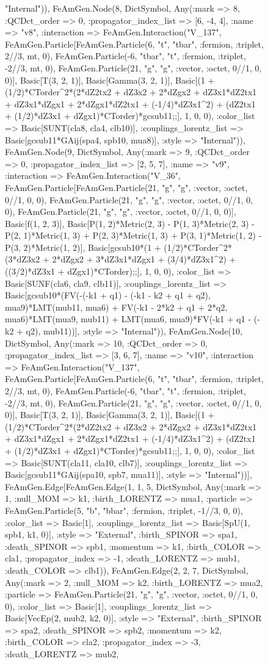 \documentclass{revtex4}
\begin{document}
\begin{figure}[!htb]
\begin{center}
{"Internal")), FeAmGen.Node(8, Dict{Symbol, Any}(:mark => 8, :QCDct_order => 0, :propagator_index_list => [6, -4, 4], :name => "v8", :interaction => FeAmGen.Interaction("V_137", FeAmGen.Particle[FeAmGen.Particle(6, "t", "tbar", :fermion, :triplet, 2//3, mt, 0), FeAmGen.Particle(-6, "tbar", "t", :fermion, :triplet, -2//3, mt, 0), FeAmGen.Particle(21, "g", "g", :vector, :octet, 0//1, 0, 0)], Basic[T(3, 2, 1)], Basic[Gamma(3, 2, 1)], Basic[(1 + (1/2)*CTorder^2*(2*dZ2tx2 + dZ3x2 + 2*dZgx2 + dZ3x1*dZ2tx1 + dZ3x1*dZgx1 + 2*dZgx1*dZ2tx1 + (-1/4)*dZ3x1^2) + (dZ2tx1 + (1/2)*dZ3x1 + dZgx1)*CTorder)*gcsub11;;], 1, 0, 0), :color_list => Basic[SUNT(cla8, cla4, clb10)], :couplings_lorentz_list => Basic[gcsub11*GAij(spa4, spb10, mua8)], :style => "Internal")), FeAmGen.Node(9, Dict{Symbol, Any}(:mark => 9, :QCDct_order => 0, :propagator_index_list => [2, 5, 7], :name => "v9", :interaction => FeAmGen.Interaction("V_36", FeAmGen.Particle[FeAmGen.Particle(21, "g", "g", :vector, :octet, 0//1, 0, 0), FeAmGen.Particle(21, "g", "g", :vector, :octet, 0//1, 0, 0), FeAmGen.Particle(21, "g", "g", :vector, :octet, 0//1, 0, 0)], Basic[f(1, 2, 3)], Basic[P(1, 2)*Metric(2, 3) - P(1, 3)*Metric(2, 3) - P(2, 1)*Metric(1, 3) + P(2, 3)*Metric(1, 3) + P(3, 1)*Metric(1, 2) - P(3, 2)*Metric(1, 2)], Basic[gcsub10*(1 + (1/2)*CTorder^2*(3*dZ3x2 + 2*dZgx2 + 3*dZ3x1*dZgx1 + (3/4)*dZ3x1^2) + ((3/2)*dZ3x1 + dZgx1)*CTorder);;], 1, 0, 0), :color_list => Basic[SUNF(cla6, cla9, clb11)], :couplings_lorentz_list => Basic[gcsub10*(FV(-(-k1 + q1) - (-k1 - k2 + q1 + q2), mua9)*LMT(mub11, mua6) + FV(-k1 - 2*k2 + q1 + 2*q2, mua6)*LMT(mua9, mub11) + LMT(mua6, mua9)*FV(-k1 + q1 - (-k2 + q2), mub11))], :style => "Internal")), FeAmGen.Node(10, Dict{Symbol, Any}(:mark => 10, :QCDct_order => 0, :propagator_index_list => [3, 6, 7], :name => "v10", :interaction => FeAmGen.Interaction("V_137", FeAmGen.Particle[FeAmGen.Particle(6, "t", "tbar", :fermion, :triplet, 2//3, mt, 0), FeAmGen.Particle(-6, "tbar", "t", :fermion, :triplet, -2//3, mt, 0), FeAmGen.Particle(21, "g", "g", :vector, :octet, 0//1, 0, 0)], Basic[T(3, 2, 1)], Basic[Gamma(3, 2, 1)], Basic[(1 + (1/2)*CTorder^2*(2*dZ2tx2 + dZ3x2 + 2*dZgx2 + dZ3x1*dZ2tx1 + dZ3x1*dZgx1 + 2*dZgx1*dZ2tx1 + (-1/4)*dZ3x1^2) + (dZ2tx1 + (1/2)*dZ3x1 + dZgx1)*CTorder)*gcsub11;;], 1, 0, 0), :color_list => Basic[SUNT(cla11, cla10, clb7)], :couplings_lorentz_list => Basic[gcsub11*GAij(spa10, spb7, mua11)], :style => "Internal"))], FeAmGen.Edge[FeAmGen.Edge(1, 1, 5, Dict{Symbol, Any}(:mark => 1, :null_MOM => k1, :birth_LORENTZ => mua1, :particle => FeAmGen.Particle(5, "b", "bbar", :fermion, :triplet, -1//3, 0, 0), :color_list => Basic[1], :couplings_lorentz_list => Basic[SpU(1, spb1, k1, 0)], :style => "External", :birth_SPINOR => spa1, :death_SPINOR => spb1, :momentum => k1, :birth_COLOR => cla1, :propagator_index => -1, :death_LORENTZ => mub1, :death_COLOR => clb1)), FeAmGen.Edge(2, 2, 7, Dict{Symbol, Any}(:mark => 2, :null_MOM => k2, :birth_LORENTZ => mua2, :particle => FeAmGen.Particle(21, "g", "g", :vector, :octet, 0//1, 0, 0), :color_list => Basic[1], :couplings_lorentz_list => Basic[VecEp(2, mub2, k2, 0)], :style => "External", :birth_SPINOR => spa2, :death_SPINOR => spb2, :momentum => k2, :birth_COLOR => cla2, :propagator_index => -3, :death_LORENTZ => mub2, }
\end{center}
\end{figure}
\end{document}
